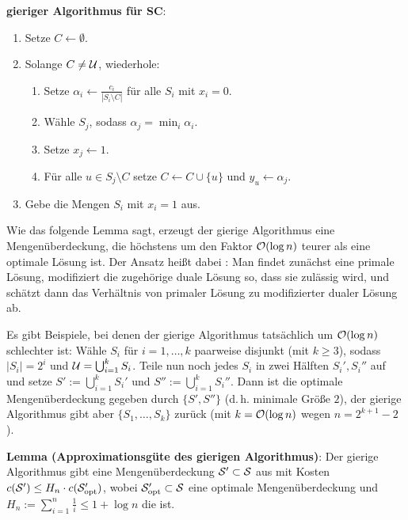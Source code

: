 \textbf{gieriger Algorithmus für SC}:
\begin{enumerate}
    \item
    Setze $C \leftarrow \emptyset$.
    
    \item
    Solange $C \not= \U$, wiederhole:
    \begin{enumerate}
        \item
        Setze $\alpha_i \leftarrow \frac{c_i}{|S_i \setminus C|}$
        für alle $S_i$ mit $x_i = 0$.
        
        \item
        Wähle $S_j$, sodass $\alpha_j = \min_i \alpha_i$.
        
        \item
        Setze $x_j \leftarrow 1$.
        
        \item
        Für alle $u \in S_j \setminus C$ setze $C \leftarrow C \cup \{u\}$ und
        $y_u \leftarrow \alpha_j$.
    \end{enumerate}
    
    \item
    Gebe die Mengen $S_i$ mit $x_i = 1$ aus.
\end{enumerate}

Wie das folgende Lemma sagt, erzeugt der gierige Algorithmus eine
Mengenüberdeckung, die höchstens um den Faktor $\O(\log n)$ teurer als
eine optimale Lösung ist.
Der Ansatz heißt dabei :
Man findet zunächst eine primale Lösung,
modifiziert die zugehörige duale Lösung so, dass sie zulässig wird,
und schätzt dann das Verhältnis von primaler Lösung zu modifizierter dualer Lösung ab.

Es gibt Beispiele, bei denen der gierige Algorithmus tatsächlich um $\O(\log n)$
schlechter ist:
Wähle $S_i$ für $i = 1, \dotsc, k$ paarweise disjunkt (mit $k \ge 3$), sodass $|S_i| = 2^i$
und $\U = \bigcup_{i=1}^k S_i$.
Teile nun noch jedes $S_i$ in zwei Hälften $S_i', S_i''$ auf und setze
$S' := \bigcup_{i=1}^k S_i'$ und $S'' := \bigcup_{i=1}^k S_i''$.
Dann ist die optimale Mengenüberdeckung gegeben durch $\{S', S''\}$
(d.\,h. minimale Größe $2$),
der gierige Algorithmus gibt aber $\{S_1, \dotsc, S_k\}$ zurück
(mit $k = \O(\log n)$ wegen $n = 2^{k+1} - 2$).

\linie

\textbf{Lemma (Approximationsgüte des gierigen Algorithmus)}:
Der gierige Algorithmus gibt eine Mengenüberdeckung $\S' \subset \S$ aus mit
Kosten $c(\S') \le H_n \cdot c(\S_\opt')$,
wobei $\S_\opt' \subset \S$ eine optimale Mengenüberdeckung und
$H_n := \sum_{i=1}^n \frac{1}{i} \le 1 + \log n$
die  ist.

